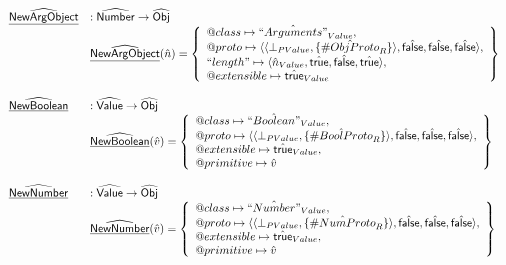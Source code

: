 \documentclass{article}
\makeatletter
\newcommand{\SF}[1]{\mbox{\textsf{#1}}}
\newcommand{\abs}[1]{\widehat{\SF{#1}}}
\newcommand{\aObj}{\abs{Obj}}
\newcommand{\set}[1]{\left\{\begin{array}{l}#1\end{array}\right\}}
\newcommand{\ahf}[1]{\widehat{\underline{\sf #1}}}
\newcommand{\varprop}[1]{@#1}
\newcommand{\avarloc}[1]{\hat{\##1}}
\newcommand{\atrue}{\hat{\SF{true}}}
\newcommand{\afalse}{\hat{\SF{false}}}
\makeatother
\begin{document}
\[
\begin{array}{ll}
\ahf{NewArgObject} & : \abs{Number} \rightarrow \aObj \\
& \ahf{NewArgObject}(\hat{n}) = \set{
    \varprop{class}\mapsto \hat{``Arguments"}_{Value},\\
    \varprop{proto}\mapsto 
    \langle\langle\bot_{PValue},\{\avarloc{ObjProto}_R\}\rangle,\afalse,\afalse,\afalse\rangle,\\
   ``length"\mapsto
   \langle\hat{n}_{Value},\atrue,\afalse,\atrue\rangle,\\
  \varprop{extensible}\mapsto \atrue_{Value}
}\\\\

\ahf{NewBoolean} & : \abs{Value} \rightarrow \aObj \\
& \ahf{NewBoolean}(\hat{v}) = \set{
    \varprop{class}\mapsto \hat{``Boolean"}_{Value},\\
    \varprop{proto}\mapsto 
    \langle\langle\bot_{PValue},\{\avarloc{BoolProto}_R\}\rangle,\afalse,\afalse,\afalse\rangle,\\
    \varprop{extensible}\mapsto \atrue_{Value}, \\
    \varprop{primitive}\mapsto \hat{v}
}\\\\

\ahf{NewNumber} & : \abs{Value} \rightarrow \aObj \\
& \ahf{NewNumber}(\hat{v}) = \set{
    \varprop{class}\mapsto \hat{``Number"}_{Value},\\
    \varprop{proto}\mapsto 
    \langle\langle\bot_{PValue},\{\avarloc{NumProto}_R\}\rangle,\afalse,\afalse,\afalse\rangle,\\
    \varprop{extensible}\mapsto \atrue_{Value}, \\
    \varprop{primitive}\mapsto \hat{v}
}\\\\


\end{array}\]
\end{document}
